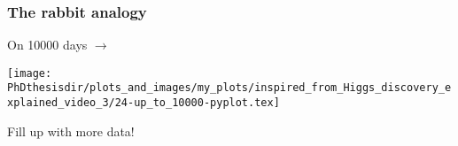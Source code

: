 
\begin{frame}
\frametitle{The rabbit analogy}
\addtocounter{framenumber}{-1}
\transwipe[direction=90]
\begin{center}
\begin{minipage}[c]{.29\textwidth}
On \num{10000} days $\rightarrow$
\end{minipage}
\begin{minipage}[c]{.4\textwidth}
\vspace{-\baselineskip}
\texttt{[image: \\PhDthesisdir/plots\_and\_images/my\_plots/inspired\_from\_Higgs\_discovery\_explained\_video\_3/24-up\_to\_10000-pyplot.tex]}
\end{minipage}
\begin{minipage}[c]{.29\textwidth}
Fill up with more data!
\end{minipage}
\end{center}
\end{frame}

